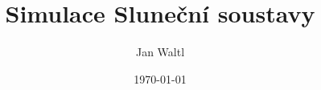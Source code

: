\documentclass[a4paper,hidelinks]{report}
\title{Simulace Sluneční soustavy}
\date{\today}
\author{Jan Waltl}
\begin{document}
	
	\newpage
	\tableofcontents
	\newpage
	
	
	
	
	
	
	
	
	
	
	\lstlistoflistings
	\listoffigures
	\listoftables
	
\end{document}

